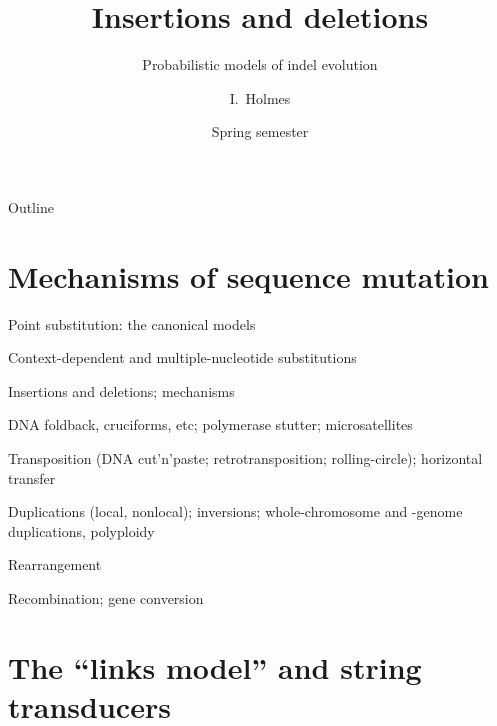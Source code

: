 \documentclass{beamer}
\title[Indels] %
{Insertions and deletions}
\subtitle
{Probabilistic models of indel evolution} %
\author%
{I.~Holmes} %
\institute[University of California, Berkeley] %
{
  Department of Bioengineering\\
  University of California, Berkeley}
\date%
{Spring semester}
\begin{document}
\begin{frame}
  \titlepage
\end{frame}

\begin{frame}{Outline}
  \tableofcontents
\end{frame}


\section{Mechanisms of sequence mutation}

\begin{frame}{}

\itemb
\item Point substitution: the canonical models
\item Context-dependent and multiple-nucleotide substitutions
\item Insertions and deletions; mechanisms
 \itemb
 \item DNA foldback, cruciforms, etc; polymerase stutter; microsatellites
 \item Transposition (DNA cut'n'paste; retrotransposition; rolling-circle); horizontal transfer
 \iteme
\item Duplications (local, nonlocal); inversions; whole-chromosome and -genome duplications, polyploidy
\item Rearrangement
\item Recombination; gene conversion
\iteme

\end{frame}

\section{The ``links model'' and string transducers}
\end{document}
